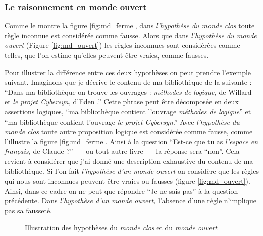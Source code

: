 \subsubsection{Le raisonnement en monde ouvert}


Comme le montre la figure \ref{fig:md_ferme}, dans \emph{l'hypothèse
  du monde clos} toute règle inconnue est considérée comme
fausse. Alors que dans \emph{l'hypothèse du monde ouvert} (Figure
\ref{fig:md_ouvert}) les règles inconnues sont considérées comme
telles, \ie que l'on estime qu'elles peuvent être vraies, comme
fausses.

Pour illustrer la différence entre ces deux hypothèses on peut prendre
l'exemple suivant. Imaginons que je décrive le contenu de ma
bibliothèque de la suivante : \enquote{Dans ma bibliothèque on trouve
  les ouvrages : \emph{méthodes de logique,} de Willard  et
  \emph{le projet \emph{Cybersyn},} d'Eden .} Cette phrase
peut être décomposée en deux assertions logiques, \enquote{ma
  bibliothèque contient l'ouvrage \emph{méthodes de logique}} et
\enquote{ma bibliothèque contient l'ouvrage \emph{le projet
    \emph{Cybersyn}}.} Avec \emph{l'hypothèse du monde clos} toute
autre proposition logique est considérée comme fausse, comme
l'illustre la figure \ref{fig:md_ferme}. Ainsi à la question
\enquote{Est-ce que tu as \emph{l'espace en français,} de Claude
   ?} ---~ou tout autre livre~--- la réponse sera
\enquote{non}. Cela revient à considérer que j'ai donné une
description exhaustive du contenu de ma bibliothèque. Si l'on fait
\emph{l'hypothèse d'un monde ouvert} on considère que les règles qui
nous sont inconnues peuvent être vraies ou fausses (figure
\ref{fig:md_ouvert}). Ainsi, dans ce cadre on ne peut que répondre
\enquote{Je ne sais pas} à la question précédente. Dans
\emph{l'hypothèse d'un monde ouvert,} l’absence d'une règle n'implique
pas sa fausseté.

\begin{figure}
  \centering
  \hspace{3cm}
  \caption{Illustration des hypothèses du \emph{monde clos} et du
    \emph{monde ouvert}}
  \label{fig:comp_md}
\end{figure}

